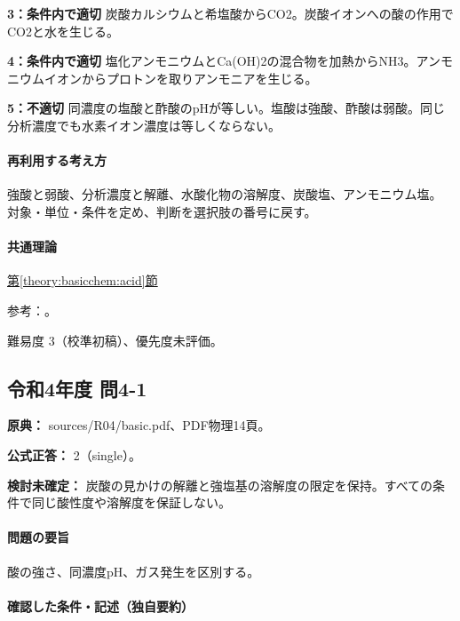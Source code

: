 \noindent\textbf{3：条件内で適切} 炭酸カルシウムと希塩酸からCO2。炭酸イオンへの酸の作用でCO2と水を生じる。\par

\noindent\textbf{4：条件内で適切} 塩化アンモニウムとCa(OH)2の混合物を加熱からNH3。アンモニウムイオンからプロトンを取りアンモニアを生じる。\par

\noindent\textbf{5：不適切} 同濃度の塩酸と酢酸のpHが等しい。塩酸は強酸、酢酸は弱酸。同じ分析濃度でも水素イオン濃度は等しくならない。\par

\paragraph{再利用する考え方} 強酸と弱酸、分析濃度と解離、水酸化物の溶解度、炭酸塩、アンモニウム塩。 対象・単位・条件を定め、判断を選択肢の番号に戻す。

\paragraph{共通理論} \hyperref[theory:basicchem:acid]{第\ref*{theory:basicchem:acid}節}

\par 参考：\cite{purdue_acid_strength,chem55_hydrolysis}。

\par 難易度 3（校準初稿）、優先度未評価。

\subsection{令和4年度 問4-1}
\label{q:r04-reg-basic-4-1}

\noindent\textbf{原典：} sources/R04/basic.pdf、PDF物理14頁。

\textbf{公式正答：} 2（single）。

\par\textbf{検討未確定：} 炭酸の見かけの解離と強塩基の溶解度の限定を保持。すべての条件で同じ酸性度や溶解度を保証しない。

\paragraph{問題の要旨} 酸の強さ、同濃度pH、ガス発生を区別する。

\paragraph{確認した条件・記述（独自要約）}\mbox{}\par

